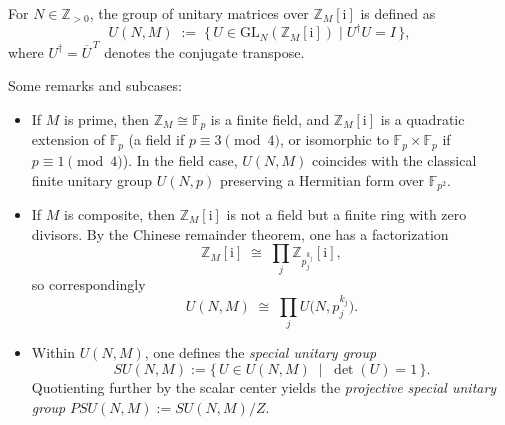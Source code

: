 \documentclass[10pt, a4paper]{article}
\newcommand{\ii}{\mathrm{i}}
\numberwithin{equation}{section}
\begin{document}
For $N \in \mathbb{Z}_{>0}$, the group of unitary matrices over $\mathbb{Z}_M[\ii]$ is defined as
\[
  U(N,M) \;:=\; \bigl\{\, U \in \mathrm{GL}_N(\mathbb{Z}_M[\ii]) \;\big|\; U^\dagger U = I \,\bigr\},
\]
where $U^\dagger = \overline{U}^{\,T}$ denotes the conjugate transpose.

\medskip
\noindent
Some remarks and subcases:
\begin{itemize}
  \item If $M$ is prime, then $\mathbb{Z}_M \cong \mathbb{F}_p$ is a finite field, and $\mathbb{Z}_M[\ii]$ is a quadratic extension of $\mathbb{F}_p$ (a field if $p \equiv 3 \pmod{4}$, or isomorphic to $\mathbb{F}_p \times \mathbb{F}_p$ if $p \equiv 1 \pmod{4}$). 
  In the field case, $U(N,M)$ coincides with the classical finite unitary group $U(N,p)$ preserving a Hermitian form over $\mathbb{F}_{p^2}$.

  \item If $M$ is composite, then $\mathbb{Z}_M[\ii]$ is not a field but a finite ring with zero divisors. 
  By the Chinese remainder theorem, one has a factorization
  \[
    \mathbb{Z}_M[\ii] \;\cong\; \prod_j \mathbb{Z}_{p_j^{k_j}}[\ii],
  \]
  so correspondingly
  \[
    U(N,M) \;\cong\; \prod_j U\!\bigl(N, p_j^{k_j}\bigr).
  \]

  \item Within $U(N,M)$, one defines the \emph{special unitary group} 
  \[
    SU(N,M) := \{\, U \in U(N,M) \;\;|\;\; \det(U) = 1 \,\}.
  \]
  Quotienting further by the scalar center yields the \emph{projective special unitary group} $PSU(N,M) := SU(N,M)/Z$.
\end{itemize}


\printbibliography
\end{document}
